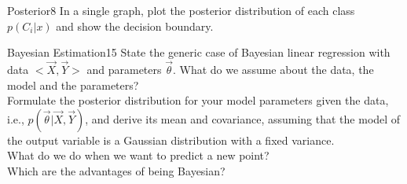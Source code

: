 \begin{questions}

\begin{question}{Posterior}{8}
In a single graph, plot the posterior distribution of each class $p(C_i|x)$ and show the decision boundary. 

\begin{answer}\end{answer}

\end{question}


\begin{question}[bonus]{Bayesian Estimation}{15}
State the generic case of Bayesian linear regression with data $<\vec X, \vec Y>$ and parameters $\vec \theta$. What do we assume about the data, the model and the parameters?\\
Formulate the posterior distribution for your model parameters given the data, i.e., $p(\vec \theta | \vec X, \vec Y)$, and derive its mean and covariance, assuming that the model of the output variable is a Gaussian distribution with a fixed variance.\\
What do we do when we want to predict a new point?\\
Which are the advantages of being Bayesian? 

\begin{answer}\end{answer}

\end{question}

\end{questions}
